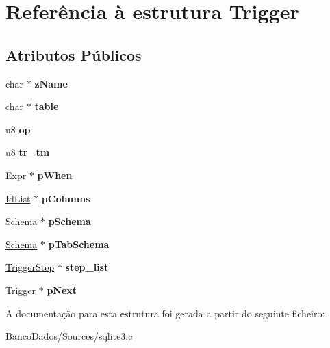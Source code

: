\hypertarget{struct_trigger}{\section{Referência à estrutura Trigger}
\label{struct_trigger}
}
\subsection*{Atributos Públicos}
\begin{DoxyCompactItemize}
\item 
\hypertarget{struct_trigger_a9aecea5dadd7ae93b7f585c4b914791c}{char $\ast$ {\bfseries z\-Name}}\label{struct_trigger_a9aecea5dadd7ae93b7f585c4b914791c}

\item 
\hypertarget{struct_trigger_ab9d5500f7fc43382e867733a2968ecae}{char $\ast$ {\bfseries table}}\label{struct_trigger_ab9d5500f7fc43382e867733a2968ecae}

\item 
\hypertarget{struct_trigger_a855d6b6a302d8d80e1d30ddd70fd403e}{u8 {\bfseries op}}\label{struct_trigger_a855d6b6a302d8d80e1d30ddd70fd403e}

\item 
\hypertarget{struct_trigger_af0d10da140b068bfd76aaeb6607fa6cf}{u8 {\bfseries tr\-\_\-tm}}\label{struct_trigger_af0d10da140b068bfd76aaeb6607fa6cf}

\item 
\hypertarget{struct_trigger_a1b6cdd46e8b98562920d1acee86281ed}{\hyperlink{struct_expr}{Expr} $\ast$ {\bfseries p\-When}}\label{struct_trigger_a1b6cdd46e8b98562920d1acee86281ed}

\item 
\hypertarget{struct_trigger_a8505fbdf63ca9eadf4b2585e99faa4e4}{\hyperlink{struct_id_list}{Id\-List} $\ast$ {\bfseries p\-Columns}}\label{struct_trigger_a8505fbdf63ca9eadf4b2585e99faa4e4}

\item 
\hypertarget{struct_trigger_a83edbfa91ce6520a6ebc1a21acc2cd5e}{\hyperlink{struct_schema}{Schema} $\ast$ {\bfseries p\-Schema}}\label{struct_trigger_a83edbfa91ce6520a6ebc1a21acc2cd5e}

\item 
\hypertarget{struct_trigger_a8e4a9b3f4bcc5c645e1777b3bb94a6d8}{\hyperlink{struct_schema}{Schema} $\ast$ {\bfseries p\-Tab\-Schema}}\label{struct_trigger_a8e4a9b3f4bcc5c645e1777b3bb94a6d8}

\item 
\hypertarget{struct_trigger_a4206faaae6cdf1a2b22a2c9f15c88642}{\hyperlink{struct_trigger_step}{Trigger\-Step} $\ast$ {\bfseries step\-\_\-list}}\label{struct_trigger_a4206faaae6cdf1a2b22a2c9f15c88642}

\item 
\hypertarget{struct_trigger_ac28107e1c45789e0146fe45867b8dfdb}{\hyperlink{struct_trigger}{Trigger} $\ast$ {\bfseries p\-Next}}\label{struct_trigger_ac28107e1c45789e0146fe45867b8dfdb}

\end{DoxyCompactItemize}


A documentação para esta estrutura foi gerada a partir do seguinte ficheiro\-:\begin{DoxyCompactItemize}
\item 
Banco\-Dados/\-Sources/sqlite3.\-c\end{DoxyCompactItemize}
